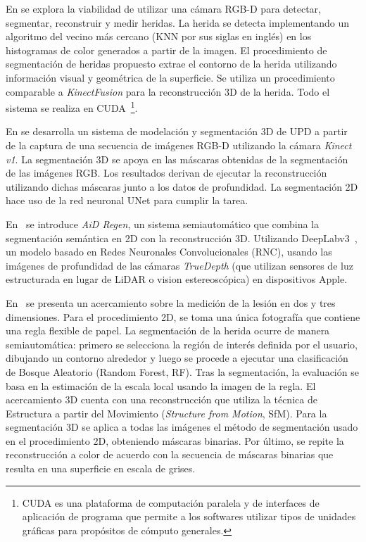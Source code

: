 En \cite{filko2018wound} se explora la viabilidad de utilizar una cámara RGB-D para detectar, segmentar, reconstruir y medir heridas. La herida se detecta implementando un algoritmo del vecino más cercano (KNN por sus siglas en inglés) en los histogramas de color generados a partir de la imagen. El procedimiento de segmentación de heridas propuesto extrae el contorno de la herida utilizando información visual y geométrica de la superficie. Se utiliza un procedimiento comparable a \textit{KinectFusion} \cite{izadi2011kinectfusion} para la reconstrucción 3D de la herida. Todo el sistema se realiza en CUDA~\footnote{CUDA es una plataforma de computación paralela y de interfaces de aplicación de programa que permite a los softwares utilizar tipos de unidades gráficas para propósitos de cómputo generales.}.

En \cite{ching2022segm3d} se desarrolla un sistema de modelación y segmentación 3D de UPD a partir de la captura de una secuencia de imágenes RGB-D utilizando la cámara \textit{Kinect v1}. La segmentación 3D se apoya en las máscaras obtenidas de la segmentación de las imágenes RGB. Los resultados derivan de ejecutar la reconstrucción utilizando dichas máscaras junto a los datos de profundidad. La segmentación 2D hace uso de la red neuronal UNet para cumplir la tarea.

En~\cite{chae2022generating} se introduce \textit{AiD Regen}, un sistema semiautomático que combina la segmentación semántica en 2D con la reconstrucción 3D. Utilizando DeepLabv3~\cite{chen2017rethinking}, un modelo basado en Redes Neuronales Convolucionales (RNC), usando las imágenes de profundidad de las cámaras \textit{TrueDepth} (que utilizan sensores de luz estructurada en lugar de LiDAR o vision estereoscópica) en dispositivos Apple.

En~\cite{mirzaalian2019measuring} se presenta un acercamiento sobre la medición de la lesión en dos y tres dimensiones. Para el procedimiento 2D, se toma una única fotografía que contiene una regla flexible de papel. La segmentación de la herida ocurre de manera semiautomática: primero se selecciona la región de interés definida por el usuario, dibujando un contorno alrededor y luego se procede a ejecutar una clasificación de Bosque Aleatorio (Random Forest, RF). Tras la segmentación, la evaluación se basa en la estimación de la escala local usando la imagen de la regla. El acercamiento 3D cuenta con una reconstrucción que utiliza la técnica de Estructura a partir del Movimiento (\textit{Structure from Motion}, SfM). Para la segmentación 3D se aplica a todas las imágenes el método de segmentación usado en el procedimiento 2D, obteniendo máscaras binarias.  Por último, se repite la reconstrucción a color de acuerdo con la secuencia de máscaras binarias que resulta en una superficie en escala de grises.

